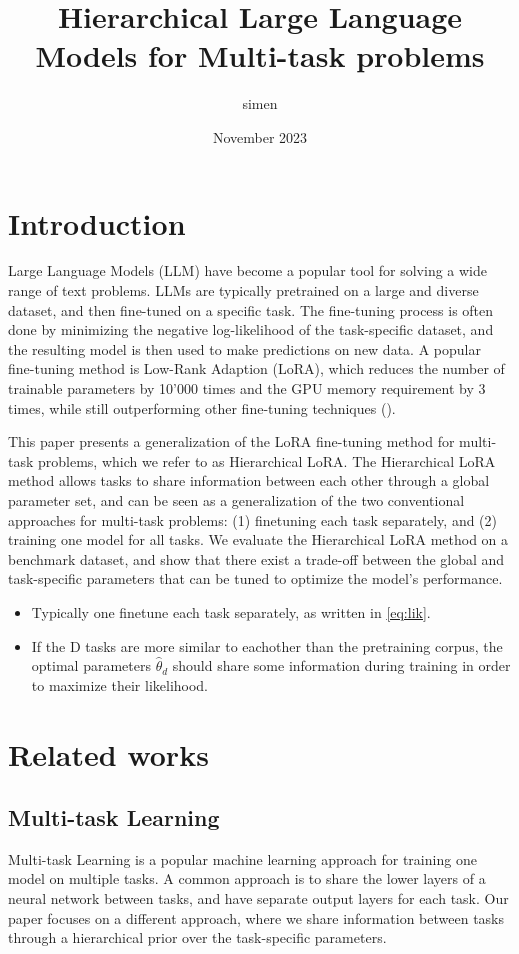 \documentclass{article}
\title{Hierarchical Large Language Models for Multi-task problems}
\author{simen }
\date{November 2023}
\begin{document}
\maketitle

\section{Introduction}
Large Language Models (LLM) have become a popular tool for solving a wide range of text problems. LLMs are typically pretrained on a large and diverse dataset, and then fine-tuned on a specific task. The fine-tuning process is often done by minimizing the negative log-likelihood of the task-specific dataset, and the resulting model is then used to make predictions on new data. A popular fine-tuning method is Low-Rank Adaption (LoRA), which reduces the number of trainable parameters by 10'000 times and the GPU memory requirement by 3 times, while still outperforming other fine-tuning techniques (\cite{hu_lora_2021}).

This paper presents a generalization of the LoRA fine-tuning method for multi-task problems, which we refer to as Hierarchical LoRA. The Hierarchical LoRA method allows tasks to share information between each other through a global parameter set, and can be seen as a generalization of the two conventional approaches for multi-task problems: (1) finetuning each task separately, and (2) training one model for all tasks. We evaluate the Hierarchical LoRA method on a benchmark dataset, and show that there exist a trade-off between the global and task-specific parameters that can be tuned to optimize the model's performance.

\begin{itemize}
    \item Typically one finetune each task separately, as written in \ref{eq:lik}.
    \item If the D tasks are more similar to eachother than the pretraining corpus, the optimal parameters $\hat{\theta}_d$ should share some information during training in order to maximize their likelihood.
\end{itemize}

\section{Related works}

\subsection{Multi-task Learning}
Multi-task Learning \cite{caruana_multitask_nodate} is a popular machine learning approach for training one model on multiple tasks. A common approach is to share the lower layers of a neural network between tasks, and have separate output layers for each task. Our paper focuses on a different approach, where we share information between tasks through a hierarchical prior over the task-specific parameters.
\end{document}
